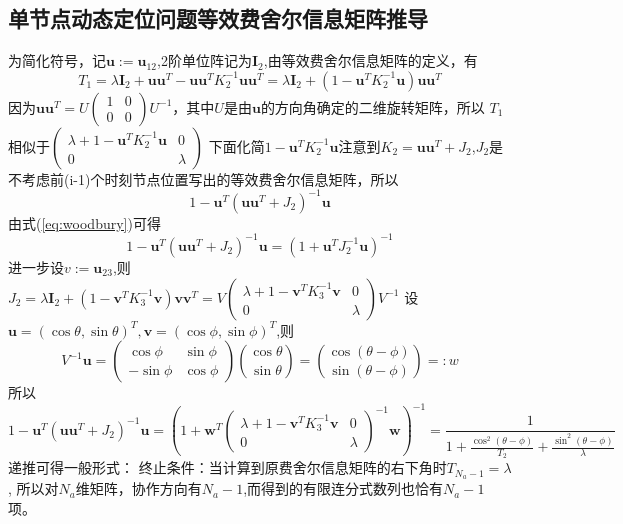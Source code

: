 \subsection{单节点动态定位问题等效费舍尔信息矩阵推导}\label{B_F_1}
为简化符号，记$\bm{u}:=\bm{u}_{12}$,2阶单位阵记为$\bm{I}_2$,由等效费舍尔信息矩阵的定义，有
\begin{equation}
  T_1=\lambda \bm{I}_2+\bm{u}\bm{u}^T-\bm{u}\bm{u}^T K_2^{-1}\bm{u}\bm{u}^T
  =\lambda \bm{I}_2+(1-\bm{u}^T K_2^{-1}\bm{u})\bm{u}\bm{u}^T
\end{equation}
因为$\bm{u}\bm{u}^T=U\begin{pmatrix}
                     1 & 0 \\
                     0 & 0
                   \end{pmatrix}U^{-1}$，其中$U$是由$\bm{u}$的方向角确定的二维旋转矩阵，所以
$T_1$相似于$\begin{pmatrix}
                           \lambda+1-\bm{u}^T K_2^{-1}\bm{u} & 0 \\
                           0 & \lambda
                         \end{pmatrix}$
下面化简$1-\bm{u}^T K_2^{-1}\bm{u}$注意到$K_2=\bm{u}\bm{u}^T+J_2$,$J_2$是不考虑前(i-1)个时刻节点位置写出的等效费舍尔信息矩阵，所以
\[
1-\bm{u}^T (\bm{u}\bm{u}^T+J_2)^{-1}\bm{u}
\]
由式(\ref{eq:woodbury})可得
\begin{equation}
1-\bm{u}^T (\bm{u}\bm{u}^T+J_2)^{-1}\bm{u}
=(1+\bm{u}^T J_2^{-1}\bm{u})^{-1}
\end{equation}
进一步设$v:=\bm{u}_{23}$,则$J_2=\lambda \bm{I}_2+(1-\bm{v}^T K_3^{-1}\bm{v})\bm{v}\bm{v}^T=V\begin{pmatrix}
                     \lambda+1-\bm{v}^T K_3^{-1}\bm{v} & 0 \\
                     0 & \lambda
                   \end{pmatrix}V^{-1}$
设$\bm{u}=(\cos\theta,\sin\theta)^T,\bm{v}=(\cos\phi,\sin\phi)^T$,则
\[
V^{-1}\bm{u}=\begin{pmatrix}
                     \cos\phi & \sin\phi \\
                     -\sin\phi & \cos\phi
                   \end{pmatrix}\binom{\cos\theta}{\sin\theta}=\binom{\cos(\theta-\phi)}{\sin(\theta-\phi)}=:w
\]
所以
\[
1-\bm{u}^T (\bm{u}\bm{u}^T+J_2)^{-1}\bm{u}=(1+\bm{w}^T \begin{pmatrix}
                     \lambda+1-\bm{v}^T K_3^{-1}\bm{v} & 0 \\
                     0 & \lambda
                   \end{pmatrix}^{-1}\bm{w})^{-1}
                   =\frac{1}{1+\frac{\cos^2(\theta-\phi)}{T_2}+\frac{\sin^2(\theta-\phi)}{\lambda}}
\]
递推可得一般形式：
终止条件：当计算到原费舍尔信息矩阵的右下角时$T_{N_a-1}=\lambda$,
所以对$N_a$维矩阵，协作方向有$N_a-1$,而得到的有限连分式数列也恰有$N_a-1$项。
